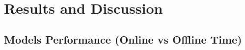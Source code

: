 \chapter{Results and Discussion}
\label{chapter:disc}

\section{Models Performance (Online vs Offline Time)}